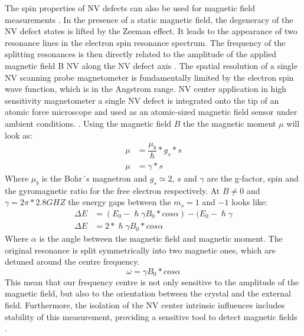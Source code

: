 The spin properties of NV defects can also be used for magnetic field measurements \cite{sage_optical_2013}. In the presence of a static magnetic field, the degeneracy of the NV defect states is lifted by the Zeeman effect.  It leads to the appearance of two resonance lines in the electron spin resonance spectrum. The frequency of the splitting resonances is then directly related to the amplitude of the applied magnetic field B NV along the NV defect axis  \cite{lesik_engineering_2015}. The spatial resolution of a single NV scanning probe magnetometer is fundamentally limited by the electron spin wave function, which is in the Angstrom range. NV center application in high sensitivity magnetometer a single NV defect is integrated onto the tip of an atomic force microscope and used as an atomic-sized magnetic ﬁeld sensor under ambient conditions. \cite{zhou_scanning_2017}.
Using the magnetic field $B$ the the magnetic moment $\mu$ will look as:\\
\begin{align}
\mu&=\dfrac{\mu_{b}}{\hslash}*g_{s}*s \\
\mu&=\gamma*s
\end{align}
Where $\mu_{b}$ is the Bohr´s magnetron and $g_{s}\simeq 2$, $s$ and $\gamma$ are the g-factor, spin and the gyromagnetic ratio for the free electron respectively. \cite{meschede_gerthsen_2015} At $B\neq 0$ and $\gamma=2\pi*2.8GHZ$ the energy gaps between the $m_{s}=1$ and $-1$ looks like:
\begin{align}
	\Delta E&=(E_{0}-\hslash \gamma B_{0}*cos\alpha)-(E_{0}-\hslash \gamma \\	
	\Delta E&=2*\hslash \gamma B_{0}*cos\alpha
\end{align}
Where $\alpha $ is the angle between the magnetic ﬁeld and magnetic moment. The original resonance is split symmetrically into two magnetic ones, which are detuned around the centre frequency.
\begin{equation}
	\omega=\gamma B_{0}*cos\alpha
\end{equation}
This mean that our frequency centre is not only sensitive to the amplitude of the magnetic ﬁeld, but also to the orientation between the crystal and the external ﬁeld. Furthermore, the isolation of the NV center intrinsic inﬂuences includes stability of this measurement, providing a sensitive tool to detect magnetic ﬁelds \cite{meschede_gerthsen_2015}.

